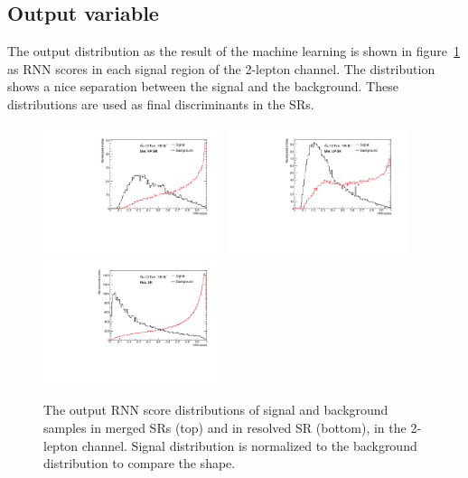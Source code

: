 \subsection{Output variable}
The output distribution as the result of the machine learning is shown in figure~\ref{fig:RNNoutput} as RNN scores in each signal region of the 2-lepton channel.
The distribution shows a nice separation between the signal and the background. These distributions are used as final discriminants in the SRs.
\begin{figure}[htbp]
    \centering
    \includegraphics[width=0.47\textwidth]{figures/RNN/ttV_0ptag1pfat0pjet_0ptv_SRVBS_HP_RNNScoreMerged.pdf}
    \includegraphics[width=0.47\textwidth]{figures/RNN/ttV_0ptag1pfat0pjet_0ptv_SRVBS_LP_RNNScoreMerged.pdf}
    \includegraphics[width=0.47\textwidth]{figures/RNN/ttV_0ptag2pjet_0ptv_SRVBS_Fid_RNNScoreResolved.pdf}
    \caption{ The output RNN score distributions of signal and background samples in merged SRs (top) and in resolved SR (bottom), in the 2-lepton channel. Signal distribution is normalized to the background distribution to compare the shape.
    }
    \label{fig:RNNoutput}
\end{figure}

